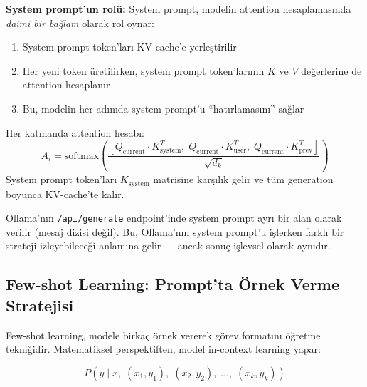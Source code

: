 \textbf{System prompt'un rol\"{u}:} System prompt, modelin attention hesaplamas{\i}nda \emph{daimi bir ba\u{g}lam} olarak rol oynar:

\begin{enumerate}
  \item System prompt token'lar{\i} KV-cache'e yerle\c{s}tirilir
  \item Her yeni token \"{u}retilirken, system prompt token'lar{\i}n{\i}n $K$ ve $V$ de\u{g}erlerine de attention hesaplan{\i}r
  \item Bu, modelin her ad{\i}mda system prompt'u ``hat{\i}rlamas{\i}n{\i}'' sa\u{g}lar
\end{enumerate}

\begin{formulbox}
Her katmanda attention hesab{\i}:
\begin{equation}
A_i = \mathrm{softmax}\!\left(\frac{[Q_{\text{current}} \cdot K_{\text{system}}^T,\; Q_{\text{current}} \cdot K_{\text{user}}^T,\; Q_{\text{current}} \cdot K_{\text{prev}}^T]}{\sqrt{d_k}}\right)
\label{eq:attention-system}
\end{equation}
System prompt token'lar{\i} $K_{\text{system}}$ matrisine kar\c{s}{\i}l{\i}k gelir ve t\"{u}m generation boyunca KV-cache'te kal{\i}r.
\end{formulbox}

\begin{dikkat}
Ollama'n{\i}n \texttt{/api/generate} endpoint'inde system prompt ayr{\i} bir alan olarak verilir (mesaj dizisi de\u{g}il). Bu, Ollama'n{\i}n system prompt'u i\c{s}lerken farkl{\i} bir strateji izleyebilece\u{g}i anlam{\i}na gelir --- ancak sonu\c{c} i\c{s}levsel olarak ayn{\i}d{\i}r.
\end{dikkat}


\subsection{Few-shot Learning: Prompt'ta \"{O}rnek Verme Stratejisi}
\label{sec:few-shot}

Few-shot learning, modele birka\c{c} \"{o}rnek vererek g\"{o}rev format{\i}n{\i} \"{o}\u{g}retme tekni\u{g}idir. Matematiksel perspektiften, model in-context learning yapar:

\begin{equation}
P(y \mid x,\; (x_1, y_1),\; (x_2, y_2),\; \ldots,\; (x_k, y_k))
\label{eq:few-shot}
\end{equation}

